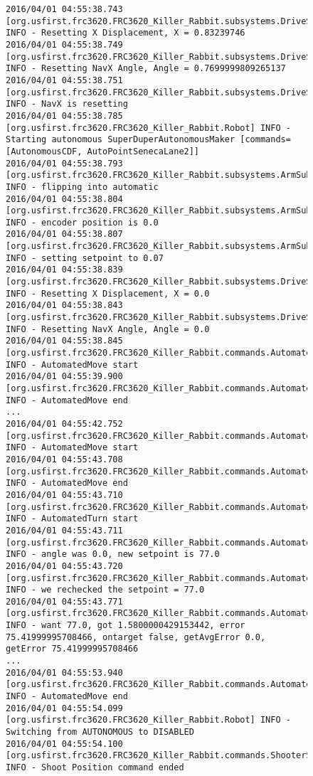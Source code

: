 \documentclass[]{article}
\begin{document}
\begin{itemize}[topsep=0pt]
\begin{figure}[h]
\begin{mdframed}
\begin{lstlisting}[basicstyle=\ttfamily\tiny]
2016/04/01 04:55:38.743 [org.usfirst.frc3620.FRC3620_Killer_Rabbit.subsystems.DriveSubsystem] INFO - Resetting X Displacement, X = 0.83239746
2016/04/01 04:55:38.749 [org.usfirst.frc3620.FRC3620_Killer_Rabbit.subsystems.DriveSubsystem] INFO - Resetting NavX Angle, Angle = 0.7699999809265137
2016/04/01 04:55:38.751 [org.usfirst.frc3620.FRC3620_Killer_Rabbit.subsystems.DriveSubsystem] INFO - NavX is resetting
2016/04/01 04:55:38.785 [org.usfirst.frc3620.FRC3620_Killer_Rabbit.Robot] INFO - Starting autonomous SuperDuperAutonomousMaker [commands=[AutonomousCDF, AutoPointSenecaLane2]]
2016/04/01 04:55:38.793 [org.usfirst.frc3620.FRC3620_Killer_Rabbit.subsystems.ArmSubsystem] INFO - flipping into automatic
2016/04/01 04:55:38.804 [org.usfirst.frc3620.FRC3620_Killer_Rabbit.subsystems.ArmSubsystem] INFO - encoder position is 0.0
2016/04/01 04:55:38.807 [org.usfirst.frc3620.FRC3620_Killer_Rabbit.subsystems.ArmSubsystem] INFO - setting setpoint to 0.07
2016/04/01 04:55:38.839 [org.usfirst.frc3620.FRC3620_Killer_Rabbit.subsystems.DriveSubsystem] INFO - Resetting X Displacement, X = 0.0
2016/04/01 04:55:38.843 [org.usfirst.frc3620.FRC3620_Killer_Rabbit.subsystems.DriveSubsystem] INFO - Resetting NavX Angle, Angle = 0.0
2016/04/01 04:55:38.845 [org.usfirst.frc3620.FRC3620_Killer_Rabbit.commands.AutomatedMove] INFO - AutomatedMove start
2016/04/01 04:55:39.900 [org.usfirst.frc3620.FRC3620_Killer_Rabbit.commands.AutomatedMove] INFO - AutomatedMove end
...
2016/04/01 04:55:42.752 [org.usfirst.frc3620.FRC3620_Killer_Rabbit.commands.AutomatedMove] INFO - AutomatedMove start
2016/04/01 04:55:43.708 [org.usfirst.frc3620.FRC3620_Killer_Rabbit.commands.AutomatedMove] INFO - AutomatedMove end
2016/04/01 04:55:43.710 [org.usfirst.frc3620.FRC3620_Killer_Rabbit.commands.AutomatedShortTurnCommand] INFO - AutomatedTurn start
2016/04/01 04:55:43.711 [org.usfirst.frc3620.FRC3620_Killer_Rabbit.commands.AutomatedShortTurnCommand] INFO - angle was 0.0, new setpoint is 77.0
2016/04/01 04:55:43.720 [org.usfirst.frc3620.FRC3620_Killer_Rabbit.commands.AutomatedShortTurnCommand] INFO - we rechecked the setpoint = 77.0
2016/04/01 04:55:43.771 [org.usfirst.frc3620.FRC3620_Killer_Rabbit.commands.AutomatedShortTurnCommand] INFO - want 77.0, got 1.5800000429153442, error 75.41999995708466, ontarget false, getAvgError 0.0, getError 75.41999995708466
...
2016/04/01 04:55:53.940 [org.usfirst.frc3620.FRC3620_Killer_Rabbit.commands.AutomatedMoveTimed] INFO - AutomatedMove end
2016/04/01 04:55:54.099 [org.usfirst.frc3620.FRC3620_Killer_Rabbit.Robot] INFO - Switching from AUTONOMOUS to DISABLED
2016/04/01 04:55:54.100 [org.usfirst.frc3620.FRC3620_Killer_Rabbit.commands.ShooterSetCloseGoal] INFO - Shoot Position command ended

\end{lstlisting}
\end{mdframed}
\end{figure}
\end{itemize}
\end{document}
